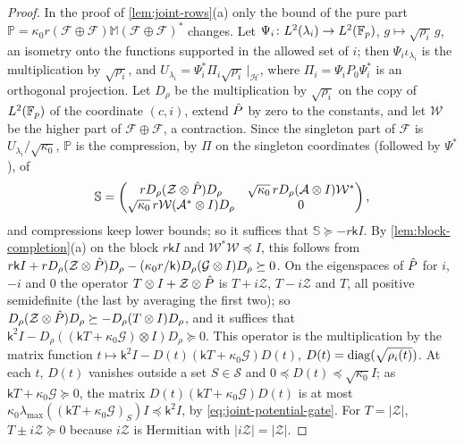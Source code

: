 \begin{proof}
In the proof of \cref{lem:joint-rows}(a) only the bound of the pure part
$\mathbb P=\kappa_0r(\mathcal F\oplus\mathcal F)\mathbb M(\mathcal F\oplus\mathcal F)^*$
changes. Let $\Psi_i\colon L^2(\lambda_i)\to L^2(\mathbb F_p)$, $g\mapsto\sqrt{\rho_i}\,g$, an
isometry onto the functions supported in the allowed set of $i$; then
$\Psi_i\iota_{\lambda_i}$ is the multiplication by $\sqrt{\rho_i}$, and
$U_{\lambda_i}=\Psi_i^*\Pi_i\sqrt{\rho_i}\,|_{\mathcal H}$, where $\Pi_i=\Psi_iP_0\Psi_i^*$ is
an orthogonal projection. Let $D_\rho$ be the multiplication by $\sqrt{\rho_i}$ on the
copy of $L^2(\mathbb F_p)$ of the coordinate $(c,i)$, extend $\hat P$ by zero to the constants,
and let $\mathcal W$ be the higher part of $\mathcal F\oplus\mathcal F$, a contraction.
Since the singleton part of $\mathcal F$ is $U_{\lambda_i}/\sqrt{\kappa_0}$, $\mathbb P$
is the compression, by $\Pi$ on the singleton coordinates (followed by $\Psi^*$), of
\[
 \mathbb S=\begin{pmatrix}rD_\rho(\mathcal Z\otimes\hat P)D_\rho&
 \sqrt{\kappa_0}\,rD_\rho(\mathcal A\otimes I)\mathcal W^*\\
 \sqrt{\kappa_0}\,r\mathcal W(\mathcal A^*\otimes I)D_\rho&0\end{pmatrix},
\]
and compressions keep lower bounds; so it suffices that $\mathbb S\succeq-r\mathsf kI$. By
\cref{lem:block-completion}(a) on the block $r\mathsf kI$ and
$\mathcal W^*\mathcal W\preceq I$,
this follows from $r\mathsf kI+rD_\rho(\mathcal Z\otimes\hat P)D_\rho-(\kappa_0r/\mathsf
k)D_\rho(\mathcal G\otimes I)D_\rho\succeq0$. On the eigenspaces of $\hat P$ for $i$, $-i$
and $0$ the operator $T\otimes I+\mathcal Z\otimes\hat P$ is $T+i\mathcal Z$, $T-i\mathcal Z$
and $T$, all positive semidefinite (the last by averaging the first two); so
$D_\rho(\mathcal Z\otimes\hat P)D_\rho\succeq-D_\rho(T\otimes I)D_\rho$, and it suffices that
$\mathsf k^2I-D_\rho((\mathsf kT+\kappa_0\mathcal G)\otimes I)D_\rho\succeq0$. This operator
is the multiplication by the matrix function $t\mapsto\mathsf k^2I-D(t)(\mathsf kT
+\kappa_0\mathcal G)D(t)$, $D(t)=\operatorname{diag}(\sqrt{\rho_i(t)})$. At each $t$, $D(t)$ vanishes
outside a set $S\in\mathcal S$ and $0\preceq D(t)\preceq\sqrt{\kappa_0}I$; as
$\mathsf kT+\kappa_0\mathcal G\succeq0$, the matrix $D(t)(\mathsf kT+\kappa_0\mathcal G)D(t)$
is at most $\kappa_0\lambda_{\max}((\mathsf kT+\kappa_0\mathcal G)_S)I\preceq\mathsf k^2I$,
by \eqref{eq:joint-potential-gate}. For $T=|\mathcal Z|$, $T\pm i\mathcal Z\succeq0$ because
$i\mathcal Z$ is Hermitian with $|i\mathcal Z|=|\mathcal Z|$.
\end{proof}

